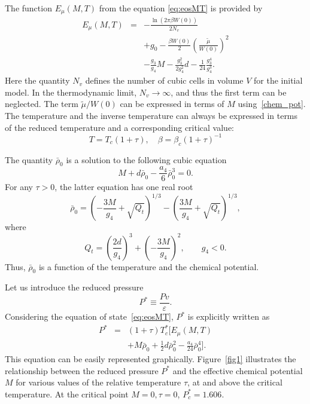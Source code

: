 The function $E_\mu(M, T)$ from the equation \eqref{eq:eosMT} is provided by
\begin{eqnarray}\label{eq:E_mu}
	E_\mu (M, T) & = & - \frac{\ln (2\pi \beta W(0))}{2 N_v}  
	\nonumber\\
	&& +  g_0 - \frac{\beta W(0)}{2} 
	\left(\frac{\tilde\mu}{W(0)} \right)^{2} 
	\nonumber\\
	&& - \frac{g_3}{g_4} {M} \! - \frac{g_3^2}{2 g_4^2}  d - \frac{1}{24} \frac{g_3^4}{g_4^3}. 
\end{eqnarray}
Here the quantity $N_v$ defines the number of cubic cells in volume $V$ for the initial model.
In the thermodynamic limit, $N_v \to \infty$, and thus the first term can be neglected. The term $\tilde{\mu}/W(0)$ can be expressed in terms of $M$ using~\eqref{chem_pot}. The temperature and the inverse temperature can always be expressed in terms of the reduced temperature and a corresponding critical value:
\begin{equation*}
	T = T_c(1+\tau), \quad \beta = \beta_c (1 + \tau)^{-1}
\end{equation*} 

The quantity $\bar{\rho}_0$ is a solution to the following cubic equation
\begin{equation}\label{eq:ro_M}
	M + d \bar\rho_0 - \frac{a_4}{6} \bar\rho_0^3 = 0.
\end{equation}
For any $\tau > 0$, the latter equation has one real root
\begin{equation}\label{eq:ro_MT}
	\bar \rho_0 = \left(- \frac{3 M}{g_4} + \sqrt{Q_t}\right)^{1/3} - \left(  \frac{3 M}{g_4} + \sqrt{Q_t} \right)^{1/3},
\end{equation}
where
\begin{equation}
	Q_t = \left(  \frac{2d}{g_4}\right)^3 + \left( -\frac{3 M}{g_4}\right)^2, \qquad g_4<0.
\end{equation}
Thus, $\bar{\rho}_0$ is a function of the temperature and the chemical potential.

Let us introduce the reduced pressure
\begin{equation}
	\label{def:reduced_pres}
	P^* \equiv \frac{P v}{\varepsilon}.
\end{equation}
Considering the equation of state~\eqref{eq:eosMT}, $P^*$ is explicitly written as
\begin{eqnarray}
	\label{eq:eosPTM_reduced}
	P^* & = & (1 + \tau)T^*_c \bigg[ E_\mu(M, T) 
	\nonumber\\
	&& + M \bar \rho_0 + \frac{1}{2} d \bar \rho_0^2 - \frac{a_4}{24} \bar \rho_0^4
	\bigg].
\end{eqnarray}
This equation can be easily represented graphically. Figure~\ref{fig1} illustrates the relationship between the reduced pressure $P^*$ and the effective chemical potential $M$ for various values of the relative temperature $\tau$, at and above the critical temperature. At the critical point $M=0, \tau=0$, $P^*_c = 1.606$. 


